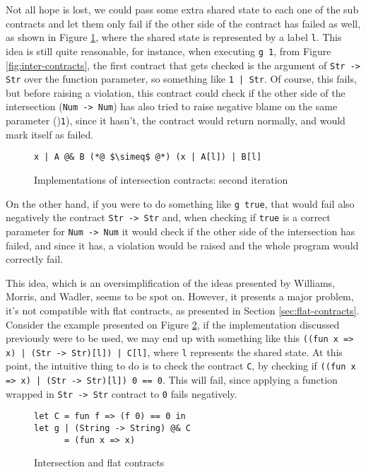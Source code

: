 \documentclass[sigplan,10pt,review,anonymous]{acmart}
\newcommand{\nickel}[1]{\lstinline[language=nickel]{#1}}
\begin{document}
Not all hope is lost, we could pass some extra shared state
to each one of the sub contracts and let them only fail if the other
side of the contract has failed as well, as shown in Figure
\ref{fig:inter-contracts-2}, where the shared state is
represented by a label \nickel{l}.
This idea is still quite reasonable, for instance, when executing
\nickel{g 1}, from Figure \ref{fig:inter-contracts}, the first contract
that gets checked is the argument of \nickel{Str -> Str} over the function parameter, so
something like \nickel{1 | Str}.
Of course, this fails, but before raising a violation, this contract could
check if the other side of the intersection (\nickel{Num -> Num}) has
also tried to raise negative blame on the same parameter ()\nickel{1}), since
it hasn't, the contract would return normally, and would mark itself as failed.

\begin{figure}[h]
\begin{lstlisting}[language=nickel, title=Implementation]
x | A @& B (*@ $\simeq$ @*) (x | A[l]) | B[l]
\end{lstlisting}
\caption{Implementations of intersection contracts: second iteration}
\label{fig:inter-contracts-2}
\end{figure}

On the other hand, if you were to do something like
\nickel{g true}, that would fail also negatively the contract
\nickel{Str -> Str} and, when checking if \nickel{true}
is a correct parameter for \nickel{Num -> Num} it would check
if the other side of the intersection has failed, and since it
has, a violation would be raised and the whole program would
correctly fail.

This idea, which is an oversimplification of the ideas
presented by Williams, Morris, and Wadler, seems to be spot on.
However, it presents a major problem, it's not compatible with flat contracts,
as presented in Section \ref{sec:flat-contracts}.
Consider the example presented on Figure \ref{fig:inter-flat-contracts}, if the
implementation discussed previously were to be used, we may end up with
something like this \nickel{((fun x => x) | (Str -> Str)[l]) | C[l]}, where
\nickel{l} represents the shared state.
At this point, the intuitive thing to do is to check the contract \nickel{C}, by
checking if \nickel{((fun x => x) | (Str -> Str)[l]) 0 == 0}.  This will fail,
since applying a function wrapped in \nickel{Str -> Str} contract to \nickel{0}
fails negatively.

\begin{figure}[h]
\begin{lstlisting}[language=nickel]
let C = fun f => (f 0) == 0 in
let g | (String -> String) @& C
      = (fun x => x) 
\end{lstlisting}
\caption{Intersection and flat contracts}
\label{fig:inter-flat-contracts}
\end{figure}
\end{document}
